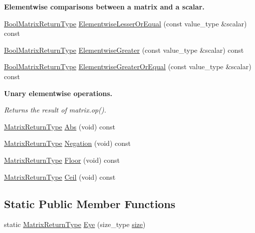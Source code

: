 \begin{Indent}{\bf Elementwise comparisons between a matrix and a scalar.}
\begin{DoxyCompactItemize}
\item 
\hyperlink{classvct_dynamic_const_matrix_base_ac71d88dda7abaaeb2276b83f2e49def7}{Bool\+Matrix\+Return\+Type} \hyperlink{classvct_dynamic_const_matrix_base_a3e89273de0ea20701bc0472b821c54e1}{Elementwise\+Lesser\+Or\+Equal} (const value\+\_\+type \&scalar) const 
\item 
\hyperlink{classvct_dynamic_const_matrix_base_ac71d88dda7abaaeb2276b83f2e49def7}{Bool\+Matrix\+Return\+Type} \hyperlink{classvct_dynamic_const_matrix_base_a6ba365be3edae6dd627eb2461dcad872}{Elementwise\+Greater} (const value\+\_\+type \&scalar) const 
\item 
\hyperlink{classvct_dynamic_const_matrix_base_ac71d88dda7abaaeb2276b83f2e49def7}{Bool\+Matrix\+Return\+Type} \hyperlink{classvct_dynamic_const_matrix_base_af0b14476cc5189fee783355d05ccd004}{Elementwise\+Greater\+Or\+Equal} (const value\+\_\+type \&scalar) const 
\end{DoxyCompactItemize}
\end{Indent}
\begin{Indent}{\bf Unary elementwise operations.}\par
{\em Returns the result of matrix.\+op(). }\begin{DoxyCompactItemize}
\item 
\hyperlink{classvct_dynamic_const_matrix_base_aed2ac5b2cf673fab97a67418f8e69646}{Matrix\+Return\+Type} \hyperlink{classvct_dynamic_const_matrix_base_a6112557b7fa9c8fc5360286334ae7898}{Abs} (void) const 
\item 
\hyperlink{classvct_dynamic_const_matrix_base_aed2ac5b2cf673fab97a67418f8e69646}{Matrix\+Return\+Type} \hyperlink{classvct_dynamic_const_matrix_base_a4d83f37fd5342669a5d3fd17271e68a9}{Negation} (void) const 
\item 
\hyperlink{classvct_dynamic_const_matrix_base_aed2ac5b2cf673fab97a67418f8e69646}{Matrix\+Return\+Type} \hyperlink{classvct_dynamic_const_matrix_base_aeadf36f7a94a997998918671bad8dff9}{Floor} (void) const 
\item 
\hyperlink{classvct_dynamic_const_matrix_base_aed2ac5b2cf673fab97a67418f8e69646}{Matrix\+Return\+Type} \hyperlink{classvct_dynamic_const_matrix_base_ad026f25a7db75e0a6a37f5faaa3a7190}{Ceil} (void) const 
\end{DoxyCompactItemize}
\end{Indent}
\subsection*{Static Public Member Functions}
\begin{DoxyCompactItemize}
\item 
static \hyperlink{classvct_dynamic_const_matrix_base_aed2ac5b2cf673fab97a67418f8e69646}{Matrix\+Return\+Type} \hyperlink{classvct_dynamic_const_matrix_base_a86f83e5cc8cc5c30cb14fc6be7d5bedf}{Eye} (size\+\_\+type \hyperlink{classvct_dynamic_const_matrix_base_ab9d484f83471aee6512ea614aa54bd0b}{size})
\end{DoxyCompactItemize}
